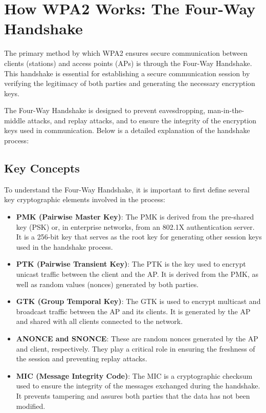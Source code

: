 \section{How WPA2 Works: The Four-Way Handshake}
The primary method by which WPA2 ensures secure communication between clients (stations) and access points (APs) is through the Four-Way Handshake. This handshake is essential for establishing a secure communication session by verifying the legitimacy of both parties and generating the necessary encryption keys.

The Four-Way Handshake is designed to prevent eavesdropping, man-in-the-middle attacks, and replay attacks, and to ensure the integrity of the encryption keys used in communication. Below is a detailed explanation of the handshake process:

\subsection{Key Concepts}
To understand the Four-Way Handshake, it is important to first define several key cryptographic elements involved in the process:

\begin{itemize}
    \item \textbf{PMK (Pairwise Master Key)}: The PMK is derived from the pre-shared key (PSK) or, in enterprise networks, from an 802.1X authentication server. It is a 256-bit key that serves as the root key for generating other session keys used in the handshake process.
    
    \item \textbf{PTK (Pairwise Transient Key)}: The PTK is the key used to encrypt unicast traffic between the client and the AP. It is derived from the PMK, as well as random values (nonces) generated by both parties.
    
    \item \textbf{GTK (Group Temporal Key)}: The GTK is used to encrypt multicast and broadcast traffic between the AP and its clients. It is generated by the AP and shared with all clients connected to the network.
    
    \item \textbf{ANONCE and SNONCE}: These are random nonces generated by the AP and client, respectively. They play a critical role in ensuring the freshness of the session and preventing replay attacks.
    
    \item \textbf{MIC (Message Integrity Code)}: The MIC is a cryptographic checksum used to ensure the integrity of the messages exchanged during the handshake. It prevents tampering and assures both parties that the data has not been modified.
\end{itemize}

